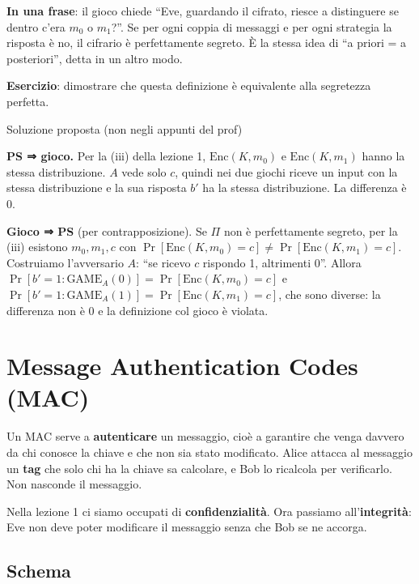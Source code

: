 \textbf{In una frase}: il gioco chiede ``Eve, guardando il cifrato, riesce a distinguere se dentro c'era \(m_0\) o \(m_1\)?''. Se per ogni coppia di messaggi e per ogni strategia la risposta è no, il cifrario è perfettamente segreto. È la stessa idea di ``a priori = a posteriori'', detta in un altro modo.

\textbf{Esercizio}: dimostrare che questa definizione è equivalente alla segretezza perfetta.

\begin{approfondimento}{Soluzione proposta (non negli appunti del prof)}

\textbf{PS ⇒ gioco.} Per la (iii) della lezione 1, \(\text{Enc}(K, m_0)\) e \(\text{Enc}(K, m_1)\) hanno la stessa distribuzione. \(A\) vede solo \(c\), quindi nei due giochi riceve un input con la stessa distribuzione e la sua risposta \(b'\) ha la stessa distribuzione. La differenza è 0.

\textbf{Gioco ⇒ PS} (per contrapposizione). Se \(\Pi\) non è perfettamente segreto, per la (iii) esistono \(m_0, m_1, c\) con \(\Pr[\text{Enc}(K, m_0) = c] \ne \Pr[\text{Enc}(K, m_1) = c]\). Costruiamo l'avversario \(A\): ``se ricevo \(c\) rispondo 1, altrimenti 0''. Allora \(\Pr[b' = 1 : \text{GAME}_A(0)] = \Pr[\text{Enc}(K, m_0) = c]\) e \(\Pr[b' = 1 : \text{GAME}_A(1)] = \Pr[\text{Enc}(K, m_1) = c]\), che sono diverse: la differenza non è 0 e la definizione col gioco è violata.

\end{approfondimento}

\section{Message Authentication Codes (MAC)}

\begin{inbreve}

Un MAC serve a \textbf{autenticare} un messaggio, cioè a garantire che venga davvero da chi conosce la chiave e che non sia stato modificato. Alice attacca al messaggio un \textbf{tag} che solo chi ha la chiave sa calcolare, e Bob lo ricalcola per verificarlo. Non nasconde il messaggio.

\end{inbreve}

Nella lezione 1 ci siamo occupati di \textbf{confidenzialità}. Ora passiamo all'\textbf{integrità}: Eve non deve poter modificare il messaggio senza che Bob se ne accorga.

\subsection{Schema}

